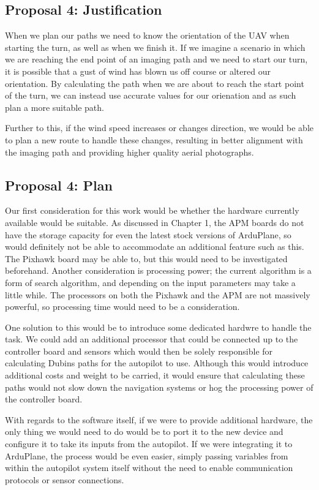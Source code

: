 \subsection{Proposal 4: Justification}
\label{future:onboardreason}

When we plan our paths we need to know the orientation of the UAV when starting the turn, as well as when we finish it. If we imagine a scenario in which we are reaching the end point of an imaging path and we need to start our turn, it is possible that a gust of wind has blown us off course or altered our orientation. By calculating the path when we are about to reach the start point of the turn, we can instead use accurate values for our orienation and as such plan a more suitable path. 

Further to this, if the wind speed increases or changes direction, we would be able to plan a new route to handle these changes, resulting in better alignment with the imaging path and providing higher quality aerial photographs. 

\subsection{Proposal 4: Plan} 
\label{future:onboardplan}

Our first consideration for this work would be whether the hardware currently available would be suitable. As discussed in Chapter 1, the APM boards do not have the storage capacity for even the latest stock versions of ArduPlane, so would definitely not be able to accommodate an additional feature such as this. The Pixhawk board may be able to, but this would need to be investigated beforehand. Another consideration is processing power; the current algorithm is a form of search algorithm, and depending on the input parameters may take a little while. The processors on both the Pixhawk and the APM are not massively powerful, so processing time would need to be a consideration. 

One solution to this would be to introduce some dedicated hardwre to handle the task. We could add an additional processor that could be connected up to the controller board and sensors which would then be solely responsible for calculating Dubins paths for the autopilot to use. Although this would introduce additional costs and weight to be carried, it would ensure that calculating these paths would not slow down the navigation systems or hog the processing power of the controller board.

With regards to the software itself, if we were to provide additional hardware, the only thing we would need to do would be to port it to the new device and configure it to take its inputs from the autopilot. If we were integrating it to ArduPlane, the process would be even easier, simply passing variables from within the autopilot system itself without the need to enable communication protocols or sensor connections. 

